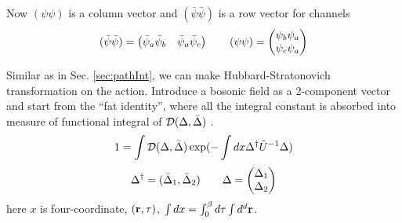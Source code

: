 Now $(\psi\psi)$ is a column vector and $(\bar\psi\bar\psi)$ is a row vector for channels
\begin{equation*}
(\bar\psi\bar\psi)=\begin{pmatrix}\bar\psi_{a}\bar\psi_{b}&\bar\psi_{a}\bar\psi_{c}\end{pmatrix}
\qquad(\psi\psi)=\begin{pmatrix}\psi_{b}\psi_{a}\\\psi_{c}\psi_{a}\end{pmatrix}
\end{equation*}

Similar as in Sec. \ref{sec:pathInt}, we can make Hubbard-Stratonovich transformation on the action.   Introduce a bosonic field as a 2-component vector   and start from the ``fat identity'', where  all the integral constant is absorbed into measure of functional integral of $\mathcal{D}(\Delta,\bar\Delta)$ \cite{Altland}.
\begin{equation}\label{eq:pathInt2:indetity}
1=\int{\ensuremath{\mathcal{D}}(\Delta,\bar\Delta)}\exp(-\int{dx}\Delta^{\dagger}\tilde{U}^{-1}\Delta)
\end{equation}
\[
\Delta^{\dagger}=(\bar\Delta_{1},\bar\Delta_{2})\qquad\Delta=\begin{pmatrix}\Delta_{1}\\\Delta_{2}\end{pmatrix}
\]
here $x$ is four-coordinate, $(\mathbf{r}, \tau)$,  $\int{dx}=\int^{\beta}_{0}d\tau\int{d^{d}\ensuremath{\mathbf{r}}}$. 

